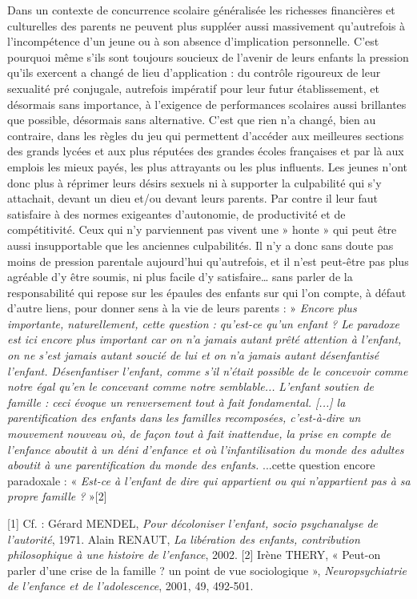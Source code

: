  Dans un contexte de concurrence scolaire généralisée les richesses financières et culturelles des parents ne peuvent plus suppléer aussi massivement qu'autrefois à l'incompétence d'un jeune ou à son absence d'implication personnelle. C'est pourquoi même s'ils sont toujours soucieux de l'avenir de leurs enfants la pression qu'ils exercent a changé de lieu d'application : du contrôle rigoureux de leur sexualité pré conjugale, autrefois impératif pour leur futur établissement, et désormais sans importance, à l'exigence de performances scolaires aussi brillantes que possible, désormais sans alternative. C'est que rien n'a changé, bien au contraire, dans les règles du jeu qui permettent d'accéder aux meilleures sections des grands lycées et aux plus réputées des grandes écoles françaises et par là aux emplois les mieux payés, les plus attrayants ou les plus influents. Les jeunes n'ont donc plus à réprimer leurs désirs sexuels ni à supporter la culpabilité qui s'y attachait, devant un dieu et/ou devant leurs parents. Par contre il leur faut satisfaire à des normes exigeantes d'autonomie, de productivité et de compétitivité. Ceux qui n'y parviennent pas vivent une » honte » qui peut être aussi insupportable que les anciennes culpabilités. Il n'y a donc sans doute pas moins de pression parentale aujourd'hui qu'autrefois, et il n'est peut-être pas plus agréable d'y être soumis, ni plus facile d'y satisfaire… 
 sans parler de la responsabilité qui repose sur les épaules des enfants sur qui l'on compte, à défaut d'autre liens, pour donner sens à la vie de leurs parents :
 » \emph{Encore plus importante, naturellement, cette question : qu'est-ce qu'un enfant ? Le paradoxe est ici encore plus important car on n'a jamais autant prêté attention à l'enfant, on ne s'est jamais autant soucié de lui et on n'a jamais autant désenfantisé l'enfant.}
 \emph{Désenfantiser l'enfant, comme s'il n'était possible de le concevoir comme notre égal qu'en le concevant comme notre semblable...}
 \emph{L'enfant soutien de famille : ceci évoque un renversement tout à fait fondamental. [...] la parentification des enfants dans les familles recomposées, c'est-à-dire un mouvement nouveau où, de façon tout à fait inattendue, la prise en compte de l'enfance aboutit à un déni d'enfance et où l'infantilisation du monde des adultes aboutit à une parentification du monde des enfants.}
 ...cette question encore paradoxale : « \emph{Est-ce à l'enfant de dire qui appartient ou qui n'appartient pas à sa propre famille ?} »[2]
 
[1] Cf. : Gérard MENDEL,\emph{ Pour décoloniser l'enfant, socio psychanalyse de l'autorité}, 1971. Alain RENAUT,\emph{ La libération des enfants, contribution philosophique à une histoire de l'enfance}, 2002.
[2] Irène THERY, « Peut-on parler d'une crise de la famille ? un point de vue sociologique », \emph{Neuropsychiatrie de l'enfance et de l'adolescence}, 2001, 49, 492-501.
